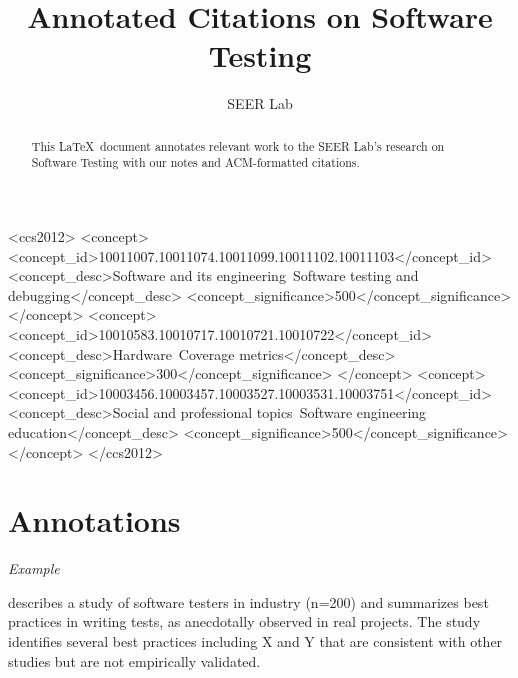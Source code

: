 \documentclass[10pt,sigconf]{acmart}
\begin{document}
\title{Annotated Citations on Software Testing}

\author{SEER Lab}


\begin{abstract}
This \LaTeX\ document annotates relevant work to the SEER Lab's research on
Software Testing with our notes and ACM-formatted citations.
\end{abstract}

%
%
\begin{CCSXML}
<ccs2012>
   <concept>
       <concept_id>10011007.10011074.10011099.10011102.10011103</concept_id>
       <concept_desc>Software and its engineering~Software testing and debugging</concept_desc>
       <concept_significance>500</concept_significance>
       </concept>
   <concept>
       <concept_id>10010583.10010717.10010721.10010722</concept_id>
       <concept_desc>Hardware~Coverage metrics</concept_desc>
       <concept_significance>300</concept_significance>
       </concept>
   <concept>
       <concept_id>10003456.10003457.10003527.10003531.10003751</concept_id>
       <concept_desc>Social and professional topics~Software engineering education</concept_desc>
       <concept_significance>500</concept_significance>
       </concept>
 </ccs2012>
\end{CCSXML}




\maketitle

\section{Annotations}

\textit{Example}

\cite{lastname-year} describes a study of software testers in industry (n=200)
and summarizes best practices in writing tests, as anecdotally observed in real
projects. The study identifies several best practices including X and Y that are
consistent with other studies \cite{abc} \cite{xyz} but are not empirically
validated.


 
\end{document}
